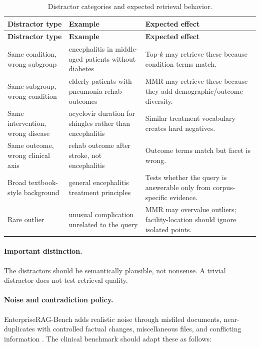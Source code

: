 \documentclass[11pt,a4paper]{article}
\begin{document}
\begin{longtable}{p{3.5cm}p{6cm}p{5.2cm}}
	\caption{Distractor categories and expected retrieval behavior.}\\
	\toprule
	\textbf{Distractor type} & \textbf{Example} & \textbf{Expected effect}\\
	\midrule
	\endfirsthead
	\toprule
	\textbf{Distractor type} & \textbf{Example} & \textbf{Expected effect}\\
	\midrule
	\endhead
	\bottomrule
	\endfoot
	Same condition, wrong subgroup & encephalitis in middle-aged patients without diabetes & Top-$k$ may retrieve these because condition terms match.\\
	Same subgroup, wrong condition & elderly patients with pneumonia rehab outcomes & MMR may retrieve these because they add demographic/outcome diversity.\\
	Same intervention, wrong disease & acyclovir duration for shingles rather than encephalitis & Similar treatment vocabulary creates hard negatives.\\
	Same outcome, wrong clinical axis & rehab outcome after stroke, not encephalitis & Outcome terms match but facet is wrong.\\
	Broad textbook-style background & general encephalitis treatment principles & Tests whether the query is answerable only from corpus-specific evidence.\\
	Rare outlier & unusual complication unrelated to the query & MMR may overvalue outliers; facility-location should ignore isolated points.\\
\end{longtable}

\paragraph{Important distinction.}
The distractors should be semantically plausible, not nonsense. A trivial distractor does not test retrieval quality.

\paragraph{Noise and contradiction policy.}
EnterpriseRAG-Bench adds realistic noise through misfiled documents, near-duplicates with controlled factual changes, miscellaneous files, and conflicting information \citep{sun2026enterpriseragbench}. The clinical benchmark should adapt these as follows:
\end{document}
